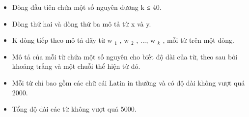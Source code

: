 \begin{itemize}
	\item     Dòng đầu tiên chứa một số nguyên dương k ≤ 40.   
	\item     Dòng thứ hai và dòng thứ ba mô tả từ x và y.   
	\item     K dòng tiếp theo mô tả dãy từ w    $_     1    $    , w    $_     2    $    , ..., w    $_     k    $    , mỗi từ trên một dòng.   
	\item     Mô tả của mỗi từ chứa một số nguyên cho biết độ dài của từ, theo sau bởi khoảng trắng và một chuỗi thể hiện từ đó.   
	\item     Mỗi từ chỉ bao gồm các chữ cái Latin in thường và có độ dài không vượt quá 2000.   
	\item     Tổng độ dài các từ không vượt quá 5000.   
\end{itemize}